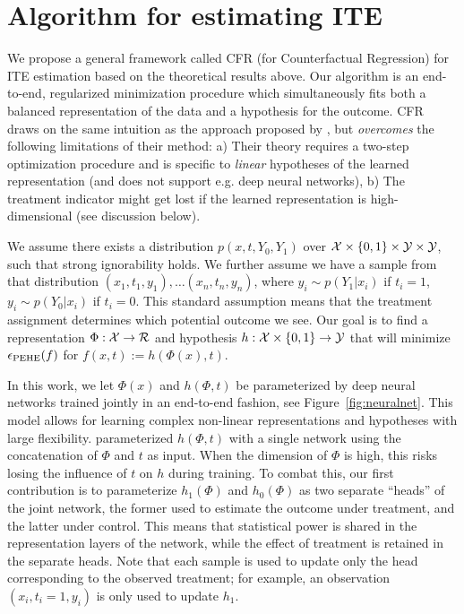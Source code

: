 \section{Algorithm for estimating ITE}\label{sec:model}

We propose a general framework called CFR (for Counterfactual Regression) for ITE estimation based on the theoretical results above. Our algorithm is an end-to-end, regularized minimization procedure which simultaneously fits both a balanced representation of the data and a hypothesis for the outcome.
CFR draws on the same intuition as the approach proposed by  \citet{johansson2016counterfactual}, but \emph{overcomes} the following limitations of their method: a) Their theory requires a two-step optimization procedure and is specific to \emph{linear} hypotheses of the learned representation (and does not support e.g. deep neural networks), b) The treatment indicator might get lost if the learned representation is high-dimensional (see discussion below).


We assume there exists a distribution $p(x,t,Y_0,Y_1)$ over $\mathcal X \times \{0,1\} \times \mathcal Y \times \mathcal Y$, such that strong ignorability holds. We further assume we have a sample from that distribution $(x_1,t_1,y_1), \dots (x_n,t_n,y_n)$, where $y_i \sim p(Y_1|x_i)$ if $t_i=1$, $y_i \sim p(Y_0|x_i)$ if $t_i=0$. This standard assumption means that the treatment assignment determines which potential outcome we see. Our goal is to find a representation $\Phi : \mathcal X \rightarrow \mathcal{R}$ and hypothesis $h:  \mathcal X \times \{0,1\} \rightarrow \mathcal Y$ that will minimize $\epsilon_{\text{PEHE}}(f)$ for $f(x,t):=h(\Phi(x),t)$.

In this work, we let $\Phi(x)$ and $h(\Phi,t)$ be parameterized by deep neural networks trained jointly in an end-to-end fashion, see Figure~\ref{fig:neuralnet}. This model allows for learning complex non-linear representations and hypotheses with large flexibility. \citet{johansson2016counterfactual} parameterized $h(\Phi,t)$ with a single network using the concatenation of $\Phi$ and $t$ as input. When the dimension of $\Phi$ is high, this risks losing the influence of $t$ on $h$ during training. To combat this, our first contribution is to parameterize $h_1(\Phi)$ and $h_0(\Phi)$ as two separate ``heads'' of the joint network, the former used to estimate the outcome under treatment, and the latter under control. This means that statistical power is shared in the representation layers of the network, while the effect of treatment is retained in the separate heads. Note that each sample is used to update only the head corresponding to the observed treatment; for example, an observation $(x_i, t_i=1, y_i)$ is only used to update $h_1$.

